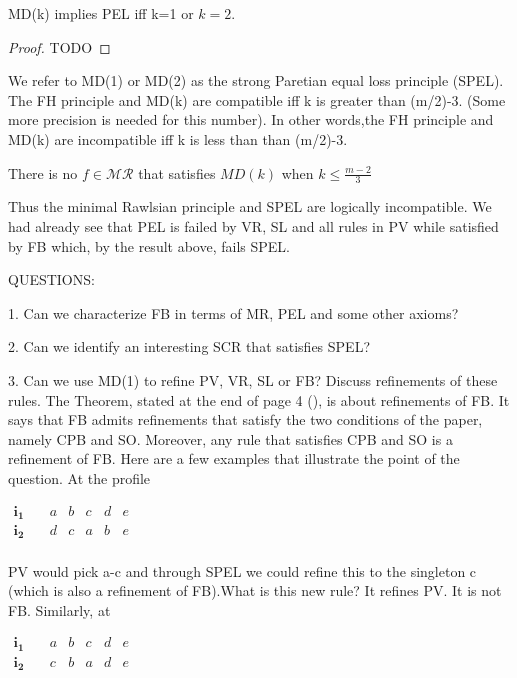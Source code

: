\documentclass[version=3.21, pagesize, twoside=off, bibliography=totoc, DIV=calc, fontsize=12pt, a4paper]{scrartcl}
\begin{document}
\begin{proposition}
    MD(k) implies PEL iff k=1 or $k = 2$.
\end{proposition}
\begin{proof}
    TODO
\end{proof}
We refer to MD(1) or MD(2) as the strong Paretian equal loss principle (SPEL). 
The FH principle and MD(k) are compatible iff k is greater than (m/2)-3. (Some more precision is needed for this number). In other words,the FH principle and MD(k) are incompatible iff k is less than than (m/2)-3.
\begin{theorem}
 There is no $f\in \mathcal{MR}$ that satisfies $MD(k)$ when $k\leq \frac{m-2}{3}$
\end{theorem}

Thus the minimal Rawlsian principle and SPEL are logically incompatible. We had already see that PEL is failed by VR, SL and all rules in PV while satisfied by FB which, by the result above, fails SPEL.

QUESTIONS:

1. Can we characterize FB in terms of MR, PEL and some other axioms?

2. Can we identify an interesting SCR that satisfies SPEL?

3. Can we use MD(1) to refine PV, VR, SL or FB? Discuss refinements of these rules. The Theorem, stated at the end of page 4 (), is about refinements of FB. It says that FB admits refinements that satisfy the two conditions of the paper, namely CPB and SO. Moreover, any rule that satisfies CPB and SO is a refinement of FB. Here are a few examples that illustrate the point of the question. At the profile 
\begin{center}
	$
	\begin{array}{cccccc}
		\mathbf{i_1} \quad &a&b&c&d&e\\
		\mathbf{i_2} \quad &d&c&a&b&e\\
	\end{array}
	$
\end{center}

PV would pick a-c and through SPEL we could refine this to the singleton c (which is also a refinement of FB).What is this new rule? It refines PV. It is not FB. Similarly, at
\begin{center}
	$
	\begin{array}{cccccc}
		\mathbf{i_1} \quad &a&b&c&d&e\\
		\mathbf{i_2} \quad &c&b&a&d&e\\
	\end{array}
	$
\end{center}
\end{document}
